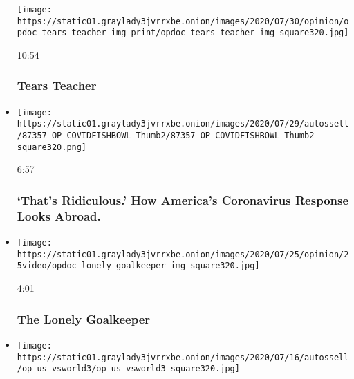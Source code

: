 \begin{itemize}
  \texttt{[image: https://static01.graylady3jvrrxbe.onion/images/2020/07/30/opinion/opdoc-tears-teacher-img-print/opdoc-tears-teacher-img-square320.jpg]}

  10:54

  \hypertarget{tears-teacher}{%
  \subsubsection{Tears Teacher}\label{tears-teacher}}
\item
  \href{https://www.nytimes3xbfgragh.onion/video/opinion/100000007227777/covid-19-global-response.html?action=click\&module=video-series-bar\&region=header\&pgtype=Article\&playlistId=video/opinion}{}

  \texttt{[image: https://static01.graylady3jvrrxbe.onion/images/2020/07/29/autossell/87357\_OP-COVIDFISHBOWL\_Thumb2/87357\_OP-COVIDFISHBOWL\_Thumb2-square320.png]}

  6:57

  \hypertarget{thats-ridiculous-how-americas-coronavirus-response-looks-abroad}{%
  \subsubsection{`That's Ridiculous.' How America's Coronavirus Response
  Looks
  Abroad.}\label{thats-ridiculous-how-americas-coronavirus-response-looks-abroad}}
\item
  \href{https://www.nytimes3xbfgragh.onion/video/opinion/100000007229285/the-lonely-goalkeeper.html?action=click\&module=video-series-bar\&region=header\&pgtype=Article\&playlistId=video/opinion}{}

  \texttt{[image: https://static01.graylady3jvrrxbe.onion/images/2020/07/25/opinion/25video/opdoc-lonely-goalkeeper-img-square320.jpg]}

  4:01

  \hypertarget{the-lonely-goalkeeper}{%
  \subsubsection{The Lonely Goalkeeper}\label{the-lonely-goalkeeper}}
\item
  \href{https://www.nytimes3xbfgragh.onion/video/opinion/100000007242791/coronavirus-response-america.html?action=click\&module=video-series-bar\&region=header\&pgtype=Article\&playlistId=video/opinion}{}

  \texttt{[image: https://static01.graylady3jvrrxbe.onion/images/2020/07/16/autossell/op-us-vsworld3/op-us-vsworld3-square320.jpg]}


\end{itemize}
